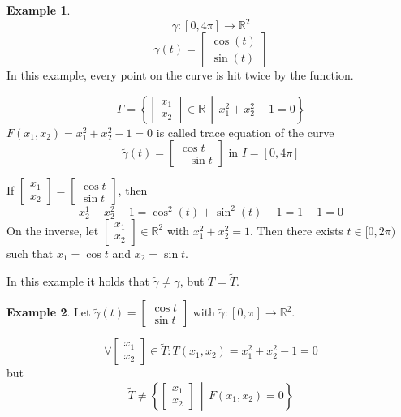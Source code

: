 \documentclass[a4paper,landscape,twocolumn]{article}
\theoremstyle{definition}
\newtheorem{ex}{Example}
\newcommand\setdef[2]{\left\{#1\,\middle|\,#2\right\}}
\begin{document}
\begin{ex}
  \[ \gamma: [0, 4\pi] \to \mathbb R^2 \]
  \[ \gamma(t) = \begin{bmatrix} \cos(t) \\ \sin(t) \end{bmatrix} \]
  In this example, every point on the curve is hit twice by the function.

  \[ \Gamma = \setdef{\begin{bmatrix} x_1 \\ x_2 \end{bmatrix} \in \mathbb R}{x_1^2 + x_2^2 - 1 =0 } \]
  $F(x_1, x_2) = x_1^2 + x_2^2 - 1 = 0$ is called trace equation of the curve
  \[ \tilde{\gamma}(t) = \begin{bmatrix} \cos{t} \\ -\sin{t} \end{bmatrix} \text{ in } I = [0, 4\pi] \]

  If $\begin{bmatrix} x_1 \\ x_2 \end{bmatrix} = \begin{bmatrix} \cos{t} \\ \sin{t} \end{bmatrix}$, then
  \[ x_2^1 + x_2^2 - 1 = \cos^2(t) + \sin^2(t) - 1 = 1 - 1 = 0 \]
  On the inverse, let $\begin{bmatrix} x_1 \\ x_2 \end{bmatrix} \in \mathbb R^2$ with $x_1^2 + x_2^2 = 1$. Then there exists $t \in [0,2\pi)$ such that $x_1 = \cos{t}$ and $x_2 = \sin{t}$.

  In this example it holds that $\tilde{\gamma} \neq \gamma$, but $T = \tilde{T}$.
\end{ex}

\begin{ex}
  Let $\tilde{\gamma}(t) = \begin{bmatrix} \cos{t} \\ \sin{t} \end{bmatrix}$ with $\tilde{\gamma}: [0,\pi] \to \mathbb R^2$.

  \[ \forall \begin{bmatrix} x_1 \\ x_2 \end{bmatrix} \in \tilde{T}: T(x_1, x_2) = x_1^2 + x_2^2 - 1 = 0 \]
  but
  \[ \tilde{T} \neq \setdef{\begin{bmatrix} x_1 \\ x_2 \end{bmatrix}}{F(x_1, x_2) = 0} \]
\end{ex}
\end{document}
